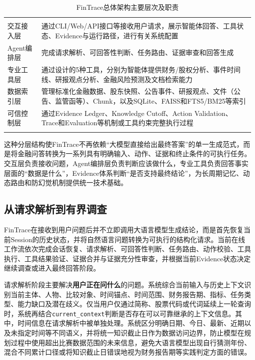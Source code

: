 \begin{table}[htbp]
  \centering
  \caption{FinTrace总体架构主要层次及职责}
  \label{tab:architecture_1}
  \begin{tabular}{C{.20\textwidth}C{.70\textwidth}}
    \fintracetoprule
     &  \\
    \fintracemidrule
    交互接入层 & 通过CLI/Web/API接口等接收用户请求，展示智能体回答、工具状态、Evidence与运行路径，进行有关系统配置 \\
    Agent编排层 & 完成请求解析、可回答性判断、任务路由、证据审查和回答生成 \\
    专业工具层 & 通过设计的5种工具，分别为智能体提供财务/股权分析、事件时间线、研报观点分析、金融风险预测及文档检索能力 \\
    数据索引层 & 管理标准化金融数据、股东快照、公告事件、研报观点、文件（公告、监管函等）、Chunk，以及SQLite、FAISS和FTS5/BM25等索引 \\
    可信控制层 & 通过Evidence Ledger、Knowledge Cutoff、Action Validation、Trace和Evaluation等机制或工具约束完整执行过程 \\
    \fintracebottomrule
  \end{tabular}
\end{table}

这种分层结构使FinTrace不再依赖“大模型直接给出最终答案”的单一生成范式，而是将金融问答转换为一系列具有明确输入、动作、证据和终止条件的可执行任务。交互层负责接收问题，Agent编排层负责判断应该做什么，专业工具负责回答事实层面的“数据是什么”，Evidence体系判断“是否支持最终结论”，为长周期记忆、动态路由和防幻觉机制提供统一技术基础。

\subsection{从请求解析到有界调查}

FinTrace在接收到用户问题后并不立即调用大语言模型生成结论，而是首先恢复当前Session的历史状态，并将自然语言问题转换为可执行的结构化请求。当前在线工作流依次完成会话恢复、请求解析、可回答性判断、任务路由、动作校验、工具执行、工具结果验证、证据合并与证据充分性审查，并根据当前Evidence状态决定继续调查或进入最终回答阶段。

请求解析阶段主要解决\textbf{用户正在问什么}的问题。系统综合当前输入与历史上下文识别当前主体、人物、比较对象、时间锚点、时间范围、财务报告期、指标、任务类型、能力缺口及潜在歧义。仅当用户仅通过简称、股票代码或代词延续上一轮查询时，系统再结合\texttt{current\_context}判断是否存在可以可靠继承的上下文信息。其中，时间信息在请求解析中被单独处理。系统区分明确日期、今日、最新、近期以及未指定时间等不同语义，并将统一知识截止日作为数据访问边界，防止模型在规划过程中使用超出比赛数据范围的未来信息，避免大语言模型出现自行猜测年份、混合不同累计口径或将知识截止日错误地视为财务报告期等实践判定方面的错误。

